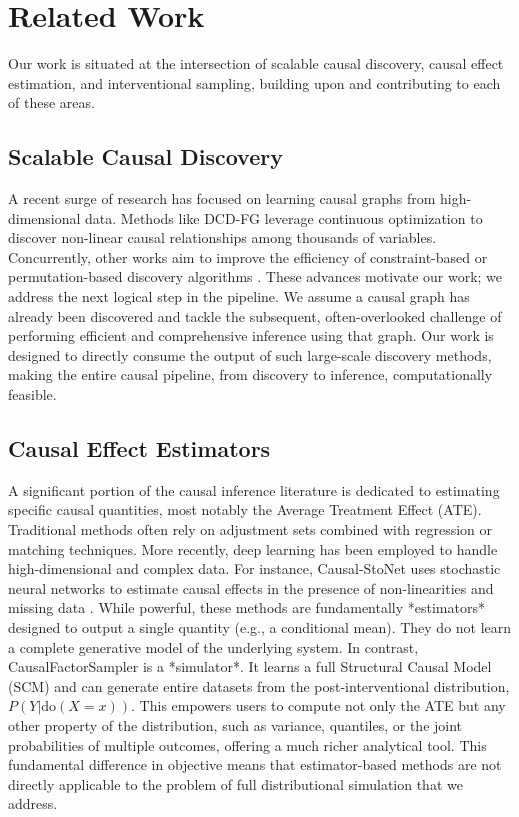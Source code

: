 \documentclass{article} %
\begin{document}
\section{Related Work}
\label{sec:related}
Our work is situated at the intersection of scalable causal discovery, causal effect estimation, and interventional sampling, building upon and contributing to each of these areas.

\subsection{Scalable Causal Discovery}
A recent surge of research has focused on learning causal graphs from high-dimensional data. Methods like DCD-FG \cite{lopez_2022_large} leverage continuous optimization to discover non-linear causal relationships among thousands of variables. Concurrently, other works aim to improve the efficiency of constraint-based or permutation-based discovery algorithms \cite{shiragur_2024_causal, shahverdikondori_2024_qwo}. These advances motivate our work; we address the next logical step in the pipeline. We assume a causal graph has already been discovered and tackle the subsequent, often-overlooked challenge of performing efficient and comprehensive inference using that graph. Our work is designed to directly consume the output of such large-scale discovery methods, making the entire causal pipeline, from discovery to inference, computationally feasible.

\subsection{Causal Effect Estimators}
A significant portion of the causal inference literature is dedicated to estimating specific causal quantities, most notably the Average Treatment Effect (ATE). Traditional methods often rely on adjustment sets combined with regression or matching techniques. More recently, deep learning has been employed to handle high-dimensional and complex data. For instance, Causal-StoNet uses stochastic neural networks to estimate causal effects in the presence of non-linearities and missing data \cite{fang_2024_causal}. While powerful, these methods are fundamentally *estimators* designed to output a single quantity (e.g., a conditional mean). They do not learn a complete generative model of the underlying system. In contrast, CausalFactorSampler is a *simulator*. It learns a full Structural Causal Model (SCM) and can generate entire datasets from the post-interventional distribution, $P(Y|\mathrm{do}(X=x))$. This empowers users to compute not only the ATE but any other property of the distribution, such as variance, quantiles, or the joint probabilities of multiple outcomes, offering a much richer analytical tool. This fundamental difference in objective means that estimator-based methods are not directly applicable to the problem of full distributional simulation that we address.
\end{document}
